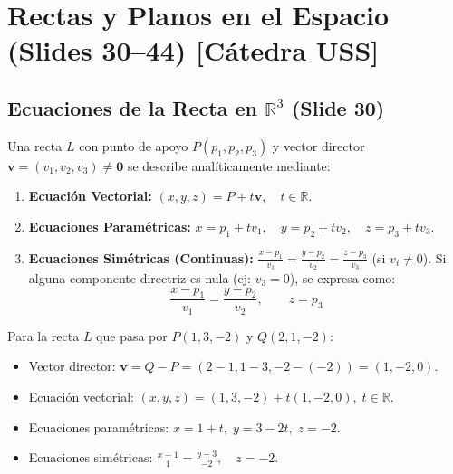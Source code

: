 \documentclass[10pt,letterpaper]{article}
\newcommand{\vv}{\mathbf{v}}
\begin{document}
\section{Rectas y Planos en el Espacio (Slides 30--44) [Cátedra USS]}

\subsection{\texorpdfstring{Ecuaciones de la Recta en $\mathbb{R}^3$ (Slide 30)}{Ecuaciones de la Recta en R3 (Slide 30)}}
Una recta $L$ con punto de apoyo $P(p_1, p_2, p_3)$ y vector director $\vv = (v_1, v_2, v_3) \neq \mathbf{0}$ se describe analíticamente mediante:
\begin{enumerate}
    \item \textbf{Ecuación Vectorial:} $(x, y, z) = P + t\vv, \quad t \in \mathbb{R}$.
    \item \textbf{Ecuaciones Paramétricas:} $x = p_1 + tv_1, \quad y = p_2 + tv_2, \quad z = p_3 + tv_3$.
    \item \textbf{Ecuaciones Simétricas (Continuas):} $\frac{x - p_1}{v_1} = \frac{y - p_2}{v_2} = \frac{z - p_3}{v_3}$ (si $v_i \neq 0$). Si alguna componente directriz es nula (ej: $v_3 = 0$), se expresa como:
    \[
    \frac{x - p_1}{v_1} = \frac{y - p_2}{v_2}, \qquad z = p_3
    \]
\end{enumerate}

\begin{cajaEjemplo}
Para la recta $L$ que pasa por $P(1, 3, -2)$ y $Q(2, 1, -2)$:
\begin{itemize}
    \item Vector director: $\vv = Q - P = (2-1, 1-3, -2 - (-2)) = (1, -2, 0)$.
    \item Ecuación vectorial: $(x, y, z) = (1, 3, -2) + t(1, -2, 0), \; t \in \mathbb{R}$.
    \item Ecuaciones paramétricas: $x = 1 + t, \; y = 3 - 2t, \; z = -2$.
    \item Ecuaciones simétricas: $\frac{x - 1}{1} = \frac{y - 3}{-2}, \quad z = -2$.
\end{itemize}
\end{cajaEjemplo}
\end{document}
